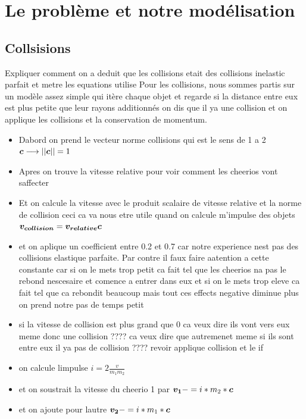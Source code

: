 \documentclass[a4paper, 11pt, oneside]{article} %
\begin{document}
\section{Le problème et notre modélisation}
    
        
        \subsection{Collsisions}
        Expliquer comment on a deduit que les collisions etait des collisions inelastic parfait et metre les equations utilise
        Pour les collisions, nous sommes partis sur un modèle assez simple qui itère chaque objet et regarde si la distance entre eux est plus petite que leur rayons additionnés on dis que il ya une collision et on applique les collisions et la conservation de momentum.
        \begin{itemize}
            \item Dabord on prend le vecteur norme collisions qui est le sens de 1 a 2 $\vb*{c} \longrightarrow ||\vb*{c}|| = 1$ 
            \item Apres on trouve la vitesse relative pour voir comment les cheerios vont saffecter
            \item Et on calcule la vitesse avec le produit scalaire de vitesse relative et la norme de collision ceci ca va nous etre utile quand on calcule m'impulse des objets $\vb*{v_{collision}}=\vb*{v_{relative}}\vb*{c} $
            \item et on aplique un coefficient entre 0.2 et 0.7 car notre experience nest pas des collisions elastique parfaite. Par contre il faux faire aatention a cette constante car si on le mets trop petit ca fait tel que les cheerios na pas le rebond nescesaire et comence a entrer dans eux et si on le mets trop eleve ca fait tel que ca rebondit beaucoup mais tout ces effects negative diminue plus on prend notre pas de temps petit
            \item si la vitesse de collision est plus grand que 0 ca veux dire ils vont vers eux meme donc une collision ???? ca veux dire que autremenet meme si ils sont entre eux il ya pas de collision ???? revoir applique collision et le if
            \item on calcule limpulse $i = 2\frac{v}{m_1 m_2}$
            \item et on soustrait la vitesse du cheerio 1 par $\vb*{v_1} -= i*m_2*\vb*{c}$
            \item et on ajoute pour lautre $\vb*{v_2} -= i*m_1*\vb*{c}$
        \end{itemize} 
\end{document}
